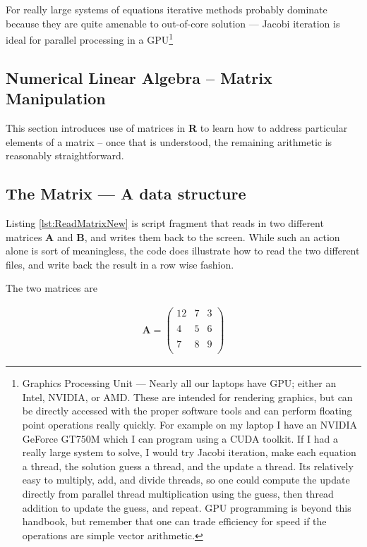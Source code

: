 For really large systems of equations iterative methods probably dominate because they are quite amenable to out-of-core solution --- Jacobi iteration is ideal for parallel processing in a GPU\footnote{Graphics Processing Unit --- Nearly all our laptops have GPU; either an Intel, NVIDIA, or AMD.  These are intended for rendering graphics, but can be directly accessed with the proper software tools and can perform floating point operations really quickly.   For example on my laptop I have an NVIDIA  GeForce GT750M which I can program using a CUDA toolkit.  If I had a really large system to solve, I would try Jacobi iteration, make each equation a thread, the solution guess a thread, and the update a thread.  Its relatively easy to multiply, add, and divide threads, so one could compute the update directly from parallel thread multiplication using the guess, then thread addition to update the guess, and repeat.  GPU programming is beyond this handbook, but remember that one can trade efficiency for speed if the operations are simple vector arithmetic.}


\subsection{Numerical Linear Algebra -- Matrix Manipulation}
This section introduces use of matrices in \textbf{R} to learn how to address particular elements of a matrix -- once that is understood, the remaining arithmetic is reasonably straightforward.   
\subsection{The Matrix --- A data structure}
Listing \ref{lst:ReadMatrixNew} is script fragment that reads in two different matrices $\mathbf{A}$ and $\mathbf{B}$, and writes them back to the screen.   
While such an action alone is sort of meaningless, the code does illustrate how to read the two different files, and write back the result in a row wise fashion.

The two matrices are

\begin{gather}
\mathbf{A} =
\begin{pmatrix}
12 & 7 & 3 \\
~\\
4 & 5 &6 \\
~\\
7 & 8 & 9 \\
\end{pmatrix}
\end{gather}

